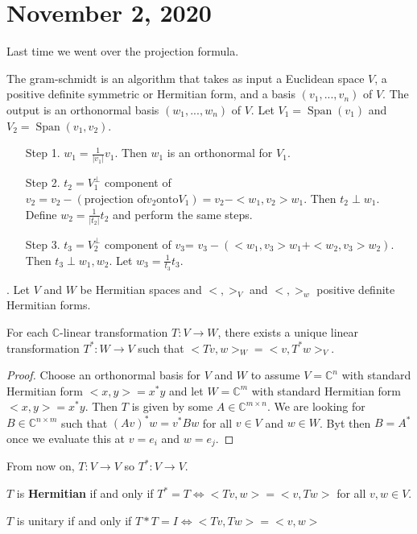 \documentclass{article}
\newcommand{\vocab}[1]{\textbf{\color{blue!90}\boldmath #1}}
\newcommand{\C}{\mathbb{C}}
\newcommand{\ra}[1][]{\xrightarrow{#1}}
\DeclareMathOperator{\Span}{Span}
\begin{document}
\section{November 2, 2020}
Last time we went over the projection formula.
\begin{definition}
The gram-schmidt is an algorithm that takes as input a Euclidean space $V$, a positive definite symmetric or Hermitian form, and a basis $(v_1,...,v_n)$ of $V$. The output is an orthonormal basis $(w_1,...,w_n)$ of $V$. Let $V_1=\Span(v_1)$ and $V_2=\Span(v_1,v_2)$.
\end{definition}
\begin{enumerate}
    \item[Step 1.] $w_1=\frac{1}{|v_1|}v_1$. Then $w_1$ is an orthonormal for $V_1$.
    \item[Step 2.] $t_2=V_1^\perp$ component of $v_2=v_2-(\textrm{projection of} v_2 \textrm{onto} V_1)=v_2-<w_1,v_2>w_1$. Then $t_2\perp w_1$. Define $w_2=\frac{1}{|t_2|}t_2$ and perform the same steps.
    \item[Step 3.] $t_3=V_2^\perp$ component of $v_3$= $v_3-(<w_1,v_3>w_1+<w_2,v_3>w_2)$. Then $t_3\perp w_1,w_2$. Let $w_3=\frac{1}{t_3}t_3$.
\end{enumerate}.
Let $V$ and $W$ be Hermitian spaces and $<,>_V$ and $<,>_w$ positive definite Hermitian forms.
\begin{proposition}
For each $\C$-linear transformation $T:V\ra W$, there exists a unique linear transformation $T^*:W\ra V$ such that $<Tv,w>_W=<v,T^*w>_V$.
\end{proposition}
\begin{proof}
Choose an orthonormal basis for $V$ and $W$ to assume $V=\C^n$ with standard Hermitian form $<x,y>=x^*y$ and let $W=\C^m$ with standard Hermitian form $<x,y>=x^*y$. Then $T$ is given by some $A\in \C^{m\times n}$. We are looking for $B\in \C^{n\times m}$ such that $(Av)^*w=v^*Bw$ for all $v\in V$ and $w\in W$. Byt then $B=A^*$ once we evaluate this at $v=e_i$ and $w=e_j$.
\end{proof}
From now on, $T:V\ra V$ so $T^*:V\ra V$.
\begin{definition}
$T$ is \vocab{Hermitian} if and only if $T^*=T\iff <Tv,w>=<v,Tw>$ for all $v,w\in V$.
\end{definition}
\begin{definition}
$T$ is unitary if and only if $T*T=I\iff <Tv,Tw>=<v,w>$
\end{definition}
\end{document}

